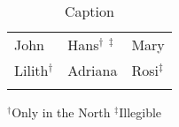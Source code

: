 \newcommand{\legendbox}[2][1]{\parbox{#1\textwidth}{\raggedright\footnotesize\noindent #2 }}

\begin{table}
    \begin{tabularx}{.8\textwidth}{QQl}
    \lsptoprule
    John & Hans$^{\dagger}$ $^{\ddagger}$   & Mary \\
    Lilith$^\dagger$     & Adriana & Rosi$^\ddagger$\\
    \lspbottomrule
    \end{tabularx}
    \legendbox[.8]{$^\dagger$Only in the North $^\ddagger$Illegible}
    \caption{Caption}
    \label{tab:my_label}
\end{table}